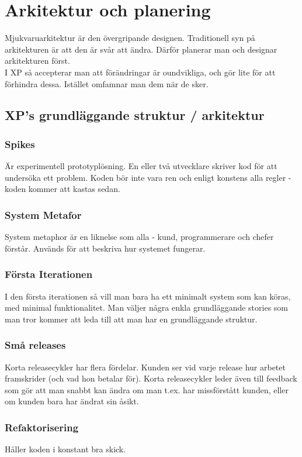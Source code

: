 \documentclass[a4paper]{article}
\begin{document}
\section{Arkitektur och planering} %
Mjukvaruarkitektur är den övergripande designen. Traditionell syn på arkitekturen är att den är svår att ändra. Därför planerar man och designar arkitekturen först. \\
I XP så accepterar man att förändringar är oundvikliga, och gör lite för att förhindra dessa. Istället omfamnar man dem när de sker.

\subsection{XP's grundläggande struktur / arkitektur}
\subsubsection*{Spikes}
Är experimentell prototyplösning. En eller två utvecklare skriver kod för att undersöka ett problem. Koden bör inte vara ren och enligt konstens alla regler - koden kommer att kastas sedan. 

\subsubsection*{System Metafor}
System metaphor är en liknelse som alla - kund, programmerare och chefer förstår. Används för att beskriva hur systemet fungerar.

\subsubsection*{Första Iterationen}
I den första iterationen så vill man bara ha ett minimalt system som kan köras, med minimal funktionalitet. Man väljer några enkla grundläggande stories som man tror kommer att leda till att man har en grundläggande struktur. 

\subsubsection*{Små releases}
Korta releasecykler har flera fördelar. Kunden ser vid varje release hur arbetet framskrider (och vad hon betalar för). Korta releasecykler leder även till feedback som gör att man snabbt kan ändra om man t.ex. har missförstått kunden, eller om kunden bara har ändrat sin åsikt. 

\subsubsection*{Refaktorisering}
Håller koden i konstant bra skick.
\end{document}
